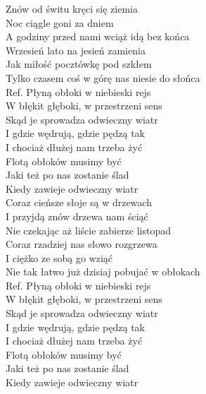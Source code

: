 
\begin{flushleft}
Znów od świtu kręci się ziemia \\
Noc ciągle goni za dniem \tab{}\\
A godziny przed nami wciąż idą bez końca \\
Wrzesień lato na jesień zamienia \\
Jak miłość pocztówkę pod szkłem \\
Tylko czasem coś w górę nas niesie do słońca  \\
\vskip 3mm
Ref. Płyną obłoki w niebieski rejs \\
\hspace{0.9cm}W błękit głęboki, w przestrzeni sens \\
\hspace{0.9cm}Skąd je sprowadza odwieczny wiatr \\
\hspace{0.9cm}I gdzie wędrują, gdzie pędzą tak \\
\hspace{0.9cm}I chociaż dłużej nam trzeba żyć \\
\hspace{0.9cm}Flotą obłoków musimy być \\
\hspace{0.9cm}Jaki też po nas zostanie ślad \\
\hspace{0.9cm}Kiedy zawieje odwieczny wiatr \\
\vskip 3mm
Coraz cieńsze słoje są w drzewach \\
I przyjdą znów drzewa nam ściąć \\
Nie czekając aż liście zabierze listopad \\
Coraz rzadziej nas słowo rozgrzewa \\
I ciężko ze sobą go wziąć \\
Nie tak łatwo już dzisiaj pobujać w obłokach \\
\vskip 3mm
Ref. Płyną obłoki w niebieski rejs\\
\hspace{0.9cm}W błękit głęboki, w przestrzeni sens \\
\hspace{0.9cm}Skąd je sprowadza odwieczny wiatr \\
\hspace{0.9cm}I gdzie wędrują, gdzie pędzą tak \\
\hspace{0.9cm}I chociaż dłużej nam trzeba żyć \\
\hspace{0.9cm}Flotą obłoków musimy być \\
\hspace{0.9cm}Jaki też po nas zostanie ślad \\
\hspace{0.9cm}Kiedy zawieje odwieczny wiatr \\
\end{flushleft}
\clearpage
